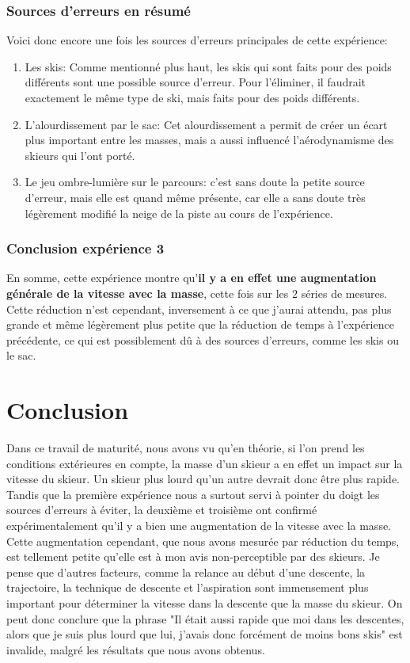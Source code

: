\documentclass{article}
\begin{document}
\subsubsection{Sources d'erreurs en résumé}
Voici donc encore une fois les sources d'erreurs principales de cette expérience:
\begin{enumerate}
    \item Les skis: Comme mentionné plus haut, les skis qui sont faits pour des poids différents sont une possible source d'erreur. Pour l'éliminer, il faudrait exactement le même type de ski, mais faits pour des poids différents.

    \item L'alourdissement par le sac: Cet alourdissement a permit de créer un écart plus important entre les masses, mais a aussi influencé l'aérodynamisme des skieurs qui l'ont porté.

    \item Le jeu ombre-lumière sur le parcours: c'est sans doute la petite source d'erreur, mais elle est quand même présente, car elle a sans doute très légèrement modifié la neige de la piste au cours de  l'expérience.
\end{enumerate}


\subsubsection{Conclusion expérience 3}
En somme, cette expérience montre qu'\textbf{il y a en effet une augmentation générale de la vitesse avec la masse}, cette fois sur les $2$ séries de mesures. Cette réduction n'est cependant, inversement à ce que j'aurai attendu, pas plus grande et même légèrement plus petite que la réduction de temps à l'expérience précédente, ce qui est possiblement dû à des sources d'erreurs, comme les skis ou le sac.

\section{Conclusion}

Dans ce travail de maturité, nous avons vu qu'en théorie, si l'on prend les conditions extérieures en compte, la masse d'un skieur a en effet un impact sur la vitesse du skieur. Un skieur plus lourd qu'un autre devrait donc être plus rapide. 
\newline Tandis que la première expérience nous a surtout servi à pointer du doigt les sources d'erreurs à éviter, la deuxième et troisième ont confirmé expérimentalement qu'il y a bien une augmentation de la vitesse avec la masse. Cette augmentation cependant, que nous avons mesurée par réduction du temps, est tellement petite qu'elle est à mon avis non-perceptible par des skieurs. Je pense que d'autres facteurs, comme la relance au début d'une descente, la trajectoire, la technique de descente et l'aspiration sont immensement plus important pour déterminer la vitesse dans la descente que la masse du skieur. On peut donc conclure que la phrase "Il était aussi rapide que moi dans les descentes, alors que je suis plus lourd que lui, j'avais donc forcément de moins bons skis" est invalide, malgré les résultats que nous avons obtenus.
\end{document}
